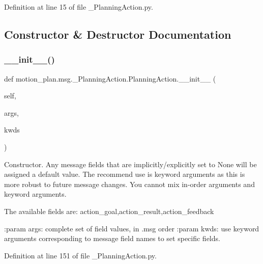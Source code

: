 Definition at line 15 of file \+\_\+\+Planning\+Action.\+py.



\subsection{Constructor \& Destructor Documentation}
\mbox{\label{classmotion__plan_1_1msg_1_1__PlanningAction_1_1PlanningAction_abd38e11621c18149d6effffbe1855ab2}} 
\subsubsection{\texorpdfstring{\+\_\+\+\_\+init\+\_\+\+\_\+()}{\_\_init\_\_()}}
{\footnotesize\ttfamily def motion\+\_\+plan.\+msg.\+\_\+\+Planning\+Action.\+Planning\+Action.\+\_\+\+\_\+init\+\_\+\+\_\+ (\begin{DoxyParamCaption}\item[{}]{self,  }\item[{}]{args,  }\item[{}]{kwds }\end{DoxyParamCaption})}

\begin{DoxyVerb}Constructor. Any message fields that are implicitly/explicitly
set to None will be assigned a default value. The recommend
use is keyword arguments as this is more robust to future message
changes.  You cannot mix in-order arguments and keyword arguments.

The available fields are:
   action_goal,action_result,action_feedback

:param args: complete set of field values, in .msg order
:param kwds: use keyword arguments corresponding to message field names
to set specific fields.
\end{DoxyVerb}
 

Definition at line 151 of file \+\_\+\+Planning\+Action.\+py.


